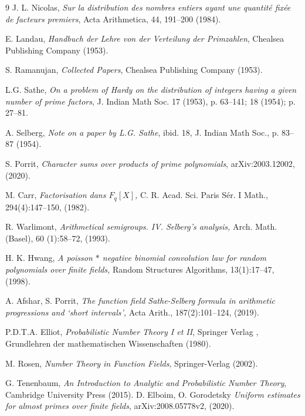 \documentclass[12pt]{amsart}
\numberwithin{equation}{section}
\theoremstyle{remark}
\theoremstyle{remark}
\theoremstyle{definition}
\begin{document}
\begin{thebibliography}{9}
J. L. Nicolas, 
\textit{Sur la distribution des nombres entiers ayant une quantité fixée de facteurs premiers}, Acta Arithmetica, 44, 191--200 (1984).\label{l4}

E. Landau, 
\textit{Handbuch der Lehre von der Verteilung der Primzahlen}, Chealsea Publishing Company (1953).\label{l30}


S. Ramanujan, 
\textit{Collected Papers}, Chealsea Publishing Company (1953).\label{l31}



L.G. Sathe, 
\textit{On a problem of Hardy on the distribution of integers having a given number of prime factors}, J. Indian Math Soc. 17 (1953), p. 63--141; 18 (1954); p. 27--81.\label{l5}


A. Selberg, \textit{Note on a paper by L.G. Sathe}, ibid. 18, J. Indian Math Soc., p. 83--87 (1954).\label{l261}


S. Porrit,
\textit{Character sums over products of prime polynomials}, arXiv:2003.12002, (2020).\label{l1}


M. Carr,
\textit{Factorisation dans $F_q[X]$,} C. R. Acad. Sci. Paris Sér. I Math., 294(4):147–150,
(1982).\label{r1}


R. Warlimont,
\textit{Arithmetical semigroups. IV. Selberg’s analysis,} Arch. Math. (Basel), 60
(1):58–72, (1993).\label{r2}


H. K. Hwang,
\textit{A poisson $\ast$ negative binomial convolution law for random polynomials over finite fields, }Random Structures Algorithms, 13(1):17–47, (1998).\label{r3}


A. Afshar, S. Porrit,
\textit{The function field Sathe-Selberg formula in arithmetic progressions and ‘short intervals’, }Acta Arith., 187(2):101–124, (2019).\label{r5}


P.D.T.A. Elliot, 
\textit{Probabilistic Number Theory I et II}, Springer Verlag , Grundlehren der mathematischen Wissenschaften (1980).\label{l32}





M. Rosen, \textit{Number Theory in Function Fields}, Springer-Verlag (2002).

G. Tenenbaum, \textit{An Introduction to Analytic and Probabilistic Number Theory}, Cambridge University Press (2015).\label{l262}
D. Elboim, O. Gorodetsky
\textit{Uniform estimates for almost primes over finite fields}, arXiv:2008.05778v2, (2020).\label{ofir}

\end{thebibliography}
\end{document}
